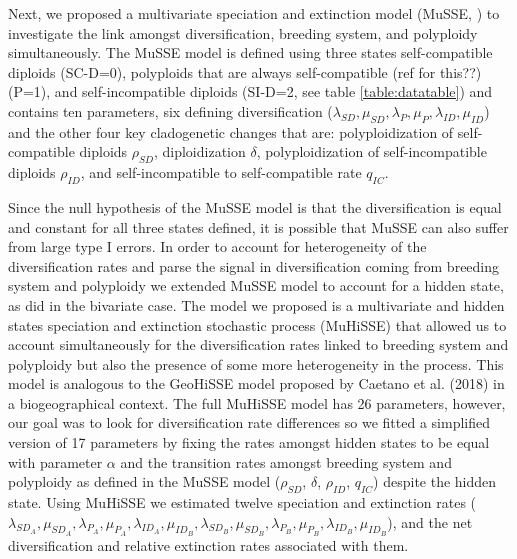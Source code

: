 Next, we proposed a multivariate speciation and extinction model (MuSSE, \citet{fitzjohn_2012}) to investigate the link amongst diversification, breeding system, and polyploidy simultaneously.
The MuSSE model is defined using three states self-compatible diploids (SC-D=0), polyploids that are always self-compatible (ref for this??) (P=1), and self-incompatible diploids (SI-D=2, see table \cref{table:datatable}) and contains ten parameters, six defining diversification ($\lambda_{SD}, \mu_{SD},\lambda_{P},\mu_{P}, \lambda_{ID},\mu_{ID}$) and the other four key cladogenetic changes that are: polyploidization of self-compatible diploids $\rho_{SD}$, diploidization $\delta$, polyploidization of self-incompatible diploids $\rho_{ID}$, and self-incompatible to self-compatible rate $q_{IC}$.

Since the null hypothesis of the MuSSE model is that the diversification is equal and constant for all three states defined, it is possible that MuSSE can also suffer from large type I errors.
In order to account for heterogeneity of the diversification rates and parse the signal in diversification coming from breeding system and polyploidy we extended MuSSE model to account for a hidden state, as \citet{beaulieu_2016} did in the bivariate case.
The model we proposed is a multivariate and hidden states speciation and extinction stochastic process (MuHiSSE) that allowed us to account simultaneously for the diversification rates linked to breeding system and polyploidy but also the presence of some more heterogeneity in the process.
This model is analogous to the GeoHiSSE model proposed by Caetano et al. (2018) in a biogeographical context.
The full MuHiSSE model has 26 parameters, however, our goal was to look for diversification rate differences so we fitted a simplified version of 17 parameters by fixing the rates amongst hidden states to be equal with parameter $\alpha$ and the transition rates amongst breeding system and polyploidy as defined in the MuSSE model  ($\rho_{SD}$,  $\delta$,  $\rho_{ID}$,  $q_{IC}$) despite the hidden state.
Using MuHiSSE we estimated twelve speciation and extinction rates ($\lambda_{SD_A}, \mu_{SD_A},\lambda_{P_A},\mu_{P_A}, \lambda_{ID_A},\mu_{ID_B},\lambda_{SD_B}, \mu_{SD_B},\lambda_{P_B},\mu_{P_B}, \lambda_{ID_B},\mu_{ID_B}$), and the net diversification and relative extinction rates associated with them.


